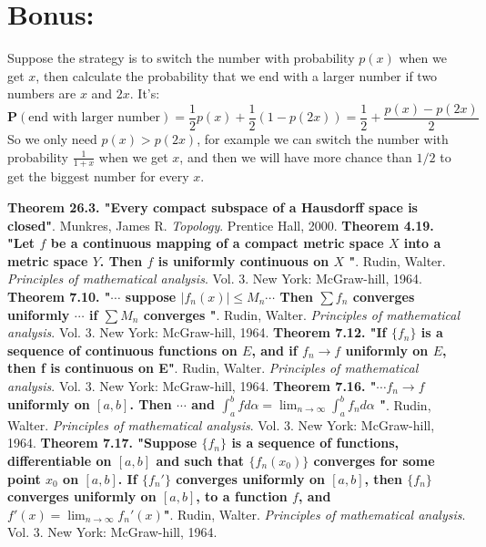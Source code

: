 \documentclass[11pt]{article}
\begin{document}
\section*{\normalsize{Bonus:}}

Suppose the strategy is to switch the number with probability $p(x)$ when we get $x$,
then calculate the probability that we end with a larger number if two numbers are $x$ and $2x$.
It's:
$$\textbf{P}(\text{end with larger number}) = \frac{1}{2} p(x) + \frac{1}{2} \left( 1 - p(2x) \right) = \frac{1}{2} + \frac{p(x) - p(2x)}{2}$$
So we only need $p(x) > p(2x)$, for example we can switch the number with probability $\frac{1}{1+x}$ when we get $x$,
and then we will have more chance than $1/2$ to get the biggest number for every $x$.

\begin{thebibliography}{1}
	 \textbf{Theorem 26.3. "Every compact subspace of a Hausdorff space is closed"}. Munkres, James R. \textit{Topology}. Prentice Hall, 2000.
	 \textbf{Theorem 4.19. "Let $f$ be a continuous mapping of a compact metric space $X$ into a metric space $Y$. Then $f$ is uniformly continuous on $X$ "}. Rudin, Walter. \textit{Principles of mathematical analysis}. Vol. 3. New York: McGraw-hill, 1964.	
	 \textbf{Theorem 7.10. "$\cdots$ suppose $|f_n(x)| \le M_n \cdots$ Then $\sum f_n$ converges uniformly $\cdots$ if $\sum M_n$ converges "}. Rudin, Walter. \textit{Principles of mathematical analysis}. Vol. 3. New York: McGraw-hill, 1964.
	 \textbf{Theorem 7.12. "If $\{f_n\}$ is a sequence of continuous functions on $E$, and if $f_n \to f$ uniformly on $E$, then f is continuous on E"}. Rudin, Walter. \textit{Principles of mathematical analysis}. Vol. 3. New York: McGraw-hill, 1964.	
	 \textbf{Theorem 7.16. "$\cdots f_n \to f$ uniformly on $[a,b]$. Then $\cdots$ and $\int_a^b f d \alpha = \lim_{n\to\infty} \int_a^b f_n d \alpha$ "}. Rudin, Walter. \textit{Principles of mathematical analysis}. Vol. 3. New York: McGraw-hill, 1964.		
	 \textbf{Theorem 7.17. "Suppose $\{f_n\}$ is a sequence of functions, differentiable on $[a,b]$ and such that $\{f_n(x_0)\}$ converges for some point $x_0$ on $[a,b]$. If $\{f_n'\}$ converges uniformly on $[a,b]$, then $\{f_n\}$ converges uniformly on $[a,b]$, to a function $f$, and $f'(x) = \lim_{n\to\infty} f_n'(x)$"}. Rudin, Walter. \textit{Principles of mathematical analysis}. Vol. 3. New York: McGraw-hill, 1964.	
\end{thebibliography}
\end{document}

